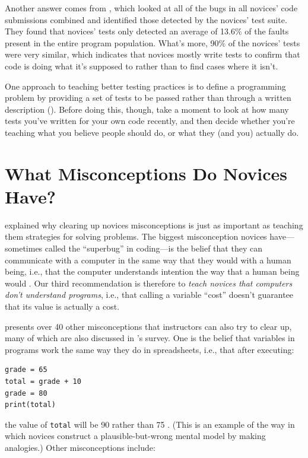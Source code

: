 Another answer comes from \cite{Edwa2014b}, which looked at all of the
bugs in all novices' code submissions combined and identified those
detected by the novices' test suite.  They found that novices' tests
only detected an average of 13.6\% of the faults present in the entire
program population.  What's more, 90\% of the novices' tests were very
similar, which indicates that novices mostly write tests to confirm
that code is doing what it's supposed to rather than to find cases
where it isn't.

One approach to teaching better testing practices is to define a
programming problem by providing a set of tests to be passed rather
than through a written description ().
Before doing this, though, take a moment to look at how many tests
you've written for your own code recently, and then decide whether
you're teaching what you believe people should do, or what they (and
you) actually do.

\section{What Misconceptions Do Novices Have?}\label{s:pck-misunderstand}

 explained why clearing up novices misconceptions is
just as important as teaching them strategies for solving problems.
The biggest misconception novices have---sometimes called the
``superbug'' in coding---is the belief that they can communicate with
a computer in the same way that they would with a human being, i.e.,
that the computer understands intention the way that a human being
would \cite{Pea1986}.  Our third recommendation is therefore to
\emph{teach novices that computers don't understand programs}, i.e.,
that calling a variable ``cost'' doesn't guarantee that its value is
actually a cost.

\cite{Sorv2018} presents over 40 other misconceptions that instructors
can also try to clear up, many of which are also discussed in
\cite{Qian2017}'s survey.  One is the belief that variables in
programs work the same way they do in spreadsheets, i.e., that after
executing:

\begin{verbatim}
grade = 65
total = grade + 10
grade = 80
print(total)
\end{verbatim}

\noindent
the value of \texttt{total} will be 90 rather than 75 \cite{Kohn2017}.
(This is an example of the way in which novices construct a
plausible-but-wrong mental model by making analogies.)  Other
misconceptions include:

